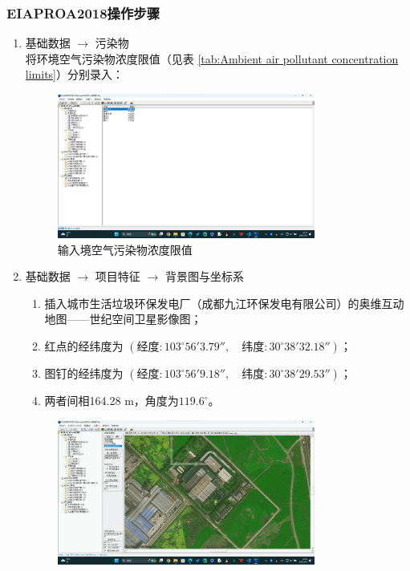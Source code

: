 \subsubsection{EIAPROA2018操作步骤}
\begin{enumerate}
    \item 基础数据 $\rightarrow $ 污染物 \\
    将环境空气污染物浓度限值（见表 \ref{tab:Ambient air pollutant concentration limits}）分别录入：
    \begin{figure}[H]
        \centering
        \includegraphics[width=0.8\textwidth]{figures/step1.png}
        \caption{输入境空气污染物浓度限值}
    \end{figure}
    \item 基础数据 $\rightarrow $ 项目特征 $\rightarrow $ 背景图与坐标系
    \begin{enumerate}[label=(\arabic*)]
        \item 插入城市生活垃圾环保发电厂（成都九江环保发电有限公司）的奥维互动地图——世纪空间卫星影像图；
        \item 红点的经纬度为 $(\text{经度}:103^{\circ}56'3.79'', \quad\text{纬度}:30^{\circ}38'32.18'')$；
        \item 图钉的经纬度为 $(\text{经度}:103^{\circ}56'9.18'', \quad\text{纬度}:30^{\circ}38'29.53'')$；
        \item 两者间相164.28 m，角度为$119.6^{\circ}$。
    \end{enumerate}
    \begin{figure}[H]
        \centering
        \includegraphics[width=0.8\textwidth]{figures/step2.png}

\end{figure}
\end{enumerate}
